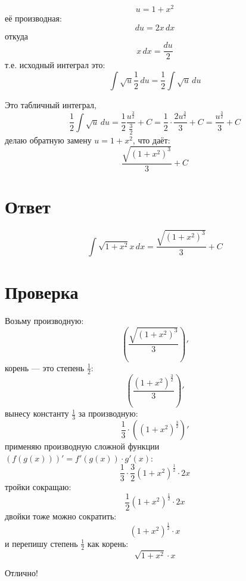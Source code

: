\documentclass{article}
\begin{document}
\[
u={1+x^2}
\]
её производная:
\[
du=2x\,dx
\]
откуда
\[
x\,dx=\frac{du}{2}
\]
т.е. исходный интеграл это:
\[
\int \sqrt{u} \frac{1}{2} \,du = \frac{1}{2} \int \sqrt{u} \,du
\]

Это табличный интеграл,
\[
\frac{1}{2} \int \sqrt{u} \,du = \frac{1}{2} \frac{u^{\frac{3}{2}}}{\frac{3}{2}} + C = \frac{1}{2}\cdot\frac{2u^{\frac{3}{2}}}{3} + C = \frac{u^{\frac{3}{2}}}{3} + C
\]
делаю обратную замену $u=1+x^2$, что даёт:
\[
\frac{\sqrt{{(1+x^2)}^3}}{3} + C
\]

\section{Ответ}
\[
\int \sqrt{1+x^2}x \,dx = \frac{\sqrt{{(1+x^2)}^3}}{3} + C
\]

\section{Проверка}
Возьму производную:
\[
\left(\frac{\sqrt{{(1+x^2)}^3}}{3}\right)'
\]
корень --- это степень $\frac{1}{2}$:
\[
\left( \frac{{(1+x^2)}^{\frac{3}{2}}}{3} \right)'
\]
вынесу константу $\frac{1}{3}$ за производную:
\[
\frac{1}{3}\cdot{}\left({(1+x^2)}^{\frac{3}{2}}\right)'
\]
применяю производную сложной функции $(f(g(x)))'=f'(g(x))\cdot{}g'(x)$:
\[
\frac{1}{3}\cdot{}\frac{3}{2}{(1+x^2)}^{\frac{1}{2}}\cdot{}2x
\]
тройки сокращаю:
\[
\frac{1}{2}{(1+x^2)}^{\frac{1}{2}}\cdot{}2x
\]
двойки тоже можно сократить:
\[
{(1+x^2)}^{\frac{1}{2}}\cdot{}x
\]
и перепишу степень $\frac{1}{2}$ как корень:
\[
\sqrt{1+x^2}\cdot{}x
\]

Отлично!
\end{document}
